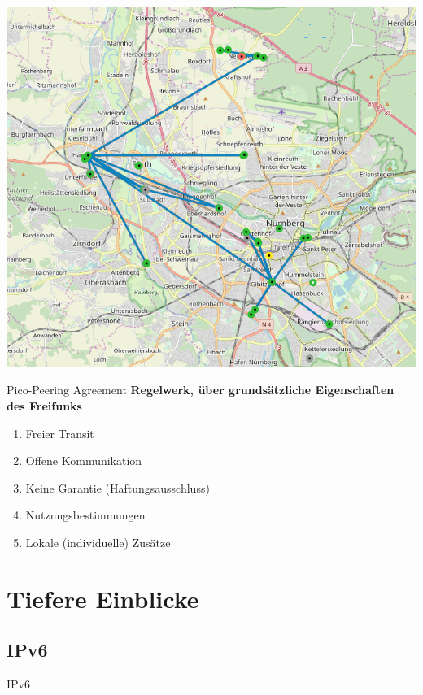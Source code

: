 \documentclass{beamer}
\begin{document}
	\begin{frame}
		\includegraphics[width=0.95\framewidth]{media/rf_nbgfue.png}
	\end{frame}

	\begin{frame}{Pico-Peering Agreement}
		\textbf{Regelwerk, über grundsätzliche Eigenschaften des Freifunks}

		\begin{enumerate}
			\item Freier Transit
			\item Offene Kommunikation
			\item Keine Garantie (Haftungsausschluss)
			\item Nutzungsbestimmungen
			\item Lokale (individuelle) Zusätze
		\end{enumerate}
	\end{frame}

	\section{Tiefere Einblicke}
	\subsection{IPv6}
	\begin{frame}{IPv6}
	\end{frame}
\end{document}
